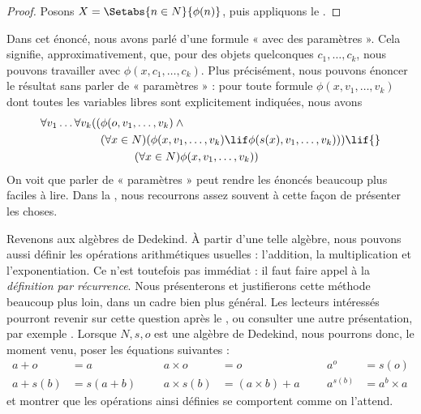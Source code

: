 \documentclass[11pt,a4paper,openany]{memoir}
\begin{document}
\begin{proof}
Posons $X = \Setabs{n \in N}{\phi(n)}$, puis appliquons le
.
\end{proof}

Dans cet énoncé, nous avons parlé d'une formule « avec des paramètres ».
Cela signifie, approximativement, que, pour des objets quelconques
$c_1,\ldots,c_k$, nous pouvons travailler avec
$\phi(x,c_1,\ldots,c_k)$. Plus précisément, nous pouvons énoncer le
résultat sans parler de « paramètres » : pour toute formule
$\phi(x,v_1,\ldots,v_k)$ dont toutes les variables libres sont
explicitement indiquées, nous avons
	\begin{align*}
			\forall v_1 \ldots \forall v_k((&\phi(o, v_1,\ldots, v_k) \land {}\\
			&	(\forall x \in N)(\phi(x,v_1, \ldots, v_k) \lif \phi(s(x), v_1,\ldots, v_k))) \lif {}\\
			&\hspace{3em} (\forall x \in N)\phi(x, v_1,\ldots, v_k))
	\end{align*}
On voit que parler de « paramètres » peut rendre les énoncés beaucoup
plus faciles à lire. Dans la , nous recourrons assez
souvent à cette façon de présenter les choses.

Revenons aux algèbres de Dedekind. À partir d'une telle algèbre, nous
pouvons aussi définir les opérations arithmétiques usuelles :
l'addition, la multiplication et l'exponentiation. Ce n'est toutefois
pas immédiat : il faut faire appel à la \emph{définition par récurrence}.
Nous présenterons et justifierons cette méthode beaucoup plus loin,
dans un cadre bien plus général. Les lecteurs intéressés pourront
revenir sur cette question après le ,
ou consulter une autre présentation, par exemple
\citealt[pp.~95--8]{Potter2004}. Lorsque $N,s,o$ est une algèbre de
Dedekind, nous pourrons donc, le moment venu, poser les équations
suivantes :
\begin{align*}
	{a} + {o} &= {a} & & & {a} \times {o} &= {o} & & & {a}^{o} &= s(o)\\
{a} + {s}({b}) &= {s}({a}+{b}) &&& {a} \times {s}({b}) &= ({a}\times {b}) + {a}  & & & {a}^{{s}({b})} &= {a}^{b} \times {a}
\end{align*}
et montrer que les opérations ainsi définies se comportent comme
on l'attend.


\endgroup
\end{document}
